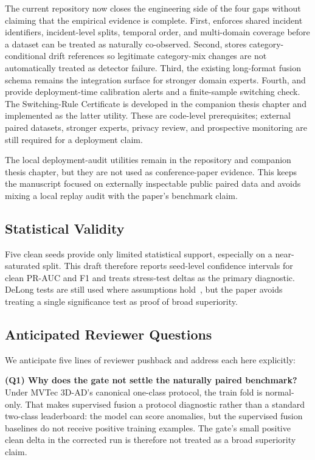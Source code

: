 \documentclass[10pt,conference]{IEEEtran}
\begin{document}
The current repository now closes the engineering side of the four gaps without
claiming that the empirical evidence is complete. First,
 enforces shared incident identifiers,
incident-level splits, temporal order, and multi-domain coverage before a
dataset can be treated as naturally co-observed. Second,
 stores category-conditional drift
references so legitimate category-mix changes are not automatically treated as
detector failure. Third, the existing long-format fusion schema remains the
integration surface for stronger domain experts. Fourth,
 and 
provide deployment-time calibration alerts and a finite-sample switching check.
The Switching-Rule Certificate is developed in the companion thesis chapter and
implemented as the latter utility.
These are code-level prerequisites; external paired datasets, stronger experts,
privacy review, and prospective monitoring are still required for a deployment
claim.

The local deployment-audit utilities remain in the repository and companion
thesis chapter, but they are not used as conference-paper evidence. This keeps
the manuscript focused on externally inspectable public paired data and avoids
mixing a local replay audit with the paper's benchmark claim.

\subsection{Statistical Validity}
Five clean seeds provide only limited statistical support, especially on a
near-saturated split. This draft therefore reports seed-level confidence
intervals for clean PR-AUC and F1 and treats stress-test deltas as the primary
diagnostic. DeLong tests are still used where assumptions hold~\cite{delong1988comparing},
but the paper avoids treating a single significance test as proof of broad
superiority.

\subsection{Anticipated Reviewer Questions}
\label{sec:reviewer-q-and-a}
We anticipate five lines of reviewer pushback and address each here
explicitly:

\noindent\textbf{(Q1) Why does the gate not settle the naturally paired
benchmark?} Under MVTec 3D-AD's canonical one-class protocol, the train fold is
normal-only. That makes supervised fusion a protocol diagnostic rather than a
standard two-class leaderboard: the model can score anomalies, but the supervised
fusion baselines do not receive positive training examples. The gate's small
positive clean delta in the corrected run is therefore not treated as a broad
superiority claim.
\end{document}
